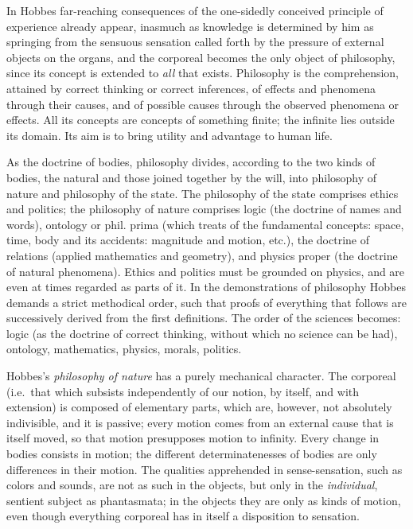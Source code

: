 In Hobbes far-reaching consequences of the one-sidedly conceived principle of experience already appear, inasmuch as knowledge is determined by him as springing from the sensuous sensation called forth by the pressure of external objects on the organs, and the corporeal becomes the only object of philosophy, since its concept is extended to \emph{all} that exists. Philosophy is the comprehension, attained by correct thinking or correct inferences, of effects and phenomena through their causes, and of possible causes through the observed phenomena or effects. All its concepts are concepts of something finite; the infinite lies outside its domain. Its aim is to bring utility and advantage to human life.

As the doctrine of bodies, philosophy divides, according to the two kinds of bodies, the natural and those joined together by the will, into philosophy of nature and philosophy of the state. The philosophy of the state comprises ethics and politics; the philosophy of nature comprises logic (the doctrine of names and words), ontology or phil. prima (which treats of the fundamental concepts: space, time, body and its accidents: magnitude and motion, etc.), the doctrine of relations (applied mathematics and geometry), and physics proper (the doctrine of natural phenomena). Ethics and politics must be grounded on physics, and are even at times regarded as parts of it. In the demonstrations of philosophy Hobbes demands a strict methodical order, such that proofs of everything that follows are successively derived from the first definitions. The order of the sciences becomes: logic (as the doctrine of correct thinking, without which no science can be had), ontology, mathematics, physics, morals, politics.

Hobbes's \emph{philosophy of nature} has a purely mechanical character. The corporeal (i.e.\ that which subsists independently of our notion, by itself, and with extension) is composed of elementary parts, which are, however, not absolutely indivisible, and it is passive; every motion comes from an external cause that is itself moved, so that motion presupposes motion to infinity. Every change in bodies consists in motion; the different determinatenesses of bodies are only differences in their motion. The qualities apprehended in sense-sensation, such as colors and sounds, are not as such in the objects, but only in the \emph{individual}, sentient subject as phantasmata; in the objects they are only \setcounter{footnote}{0}as kinds of motion, even though everything corporeal has in itself a disposition to sensation.

